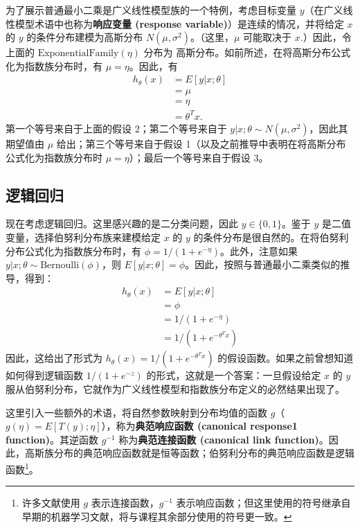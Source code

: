 为了展示普通最小二乘是广义线性模型族的一个特例，考虑目标变量 $y$（在广义线性模型术语中也称为\textbf{响应变量 (response variable)}）是连续的情况，并将给定 $x$ 的 $y$ 的条件分布建模为高斯分布 $N(\mu, \sigma^2)$。（这里，$\mu$ 可能取决于 $x$.）因此，令上面的 $\text{ExponentialFamily}(\eta)$ 分布为 高斯分布。如前所述，在将高斯分布公式化为指数族分布时，有 $\mu = \eta$。因此，有
\[
\begin{aligned}
    h_\theta(x) &= E[y|x; \theta] \\
    &= \mu \\
    &= \eta \\
    &= \theta^T x.
\end{aligned}
\]
第一个等号来自于上面的假设 2；第二个等号来自于 $y|x; \theta \sim N(\mu, \sigma^2)$，因此其期望值由 $\mu$ 给出；第三个等号来自于假设 1（以及之前推导中表明在将高斯分布公式化为指数族分布时 $\mu = \eta$）；最后一个等号来自于假设 3。

\subsection{逻辑回归}

现在考虑逻辑回归。这里感兴趣的是二分类问题，因此 $y \in \{0, 1\}$。鉴于 $y$ 是二值变量，选择伯努利分布族来建模给定 $x$ 的 $y$ 的条件分布是很自然的。在将伯努利分布公式化为指数族分布时，有 $\phi = 1/(1 + e^{-\eta})$。此外，注意如果 $y|x; \theta \sim \text{Bernoulli}(\phi)$，则 $E[y|x; \theta] = \phi$。因此，按照与普通最小二乘类似的推导，得到：
\[
\begin{aligned}
    h_\theta(x) &= E[y|x; \theta] \\
    &= \phi \\
    &= 1/(1 + e^{-\eta}) \\
    &= 1/(1 + e^{-\theta^T x})
\end{aligned}
\]
因此，这给出了形式为 $h_\theta(x) = 1/(1 + e^{-\theta^T x})$ 的假设函数。如果之前曾想知道如何得到逻辑函数 $1/(1 + e^{-z})$ 的形式，这就是一个答案：一旦假设给定 $x$ 的 $y$ 服从伯努利分布，它就作为广义线性模型和指数族分布定义的必然结果出现了。

这里引入一些额外的术语，将自然参数映射到分布均值的函数 $g$（$g(\eta) = E[T(y); \eta]$），称为\textbf{典范响应函数 (canonical response1 function)}。其逆函数 $g^{-1}$ 称为\textbf{典范连接函数 (canonical link function)}。因此，高斯族分布的典范响应函数就是恒等函数；伯努利分布的典范响应函数是逻辑函数\footnote{许多文献使用 $g$ 表示连接函数，$g^{-1}$ 表示响应函数；但这里使用的符号继承自早期的机器学习文献，将与课程其余部分使用的符号更一致。}。